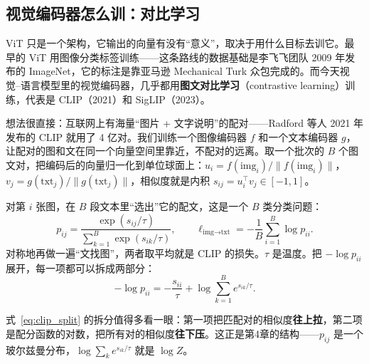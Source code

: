 \subsection{视觉编码器怎么训：对比学习}

ViT 只是一个架构，它输出的向量有没有“意义”，取决于用什么目标去训它。最早的 ViT 用图像分类标签训练——这条路线的数据基础是李飞飞团队 2009 年发布的 ImageNet，它的标注是靠亚马逊 Mechanical Turk 众包完成的。而今天视觉--语言模型里的视觉编码器，几乎都用\textbf{图文对比学习}（contrastive learning）训练，代表是 CLIP（2021）和 SigLIP（2023）。

想法很直接：互联网上有海量“图片 + 文字说明”的配对——Radford 等人 2021 年发布的 CLIP 就用了 4 亿对。我们训练一个图像编码器 $f$ 和一个文本编码器 $g$，让配对的图和文在同一个向量空间里靠近，不配对的远离。取一个批次的 $B$ 个图文对，把编码后的向量归一化到单位球面上：$u_i = f(\text{img}_i)/\|f(\text{img}_i)\|$，$v_j = g(\text{txt}_j)/\|g(\text{txt}_j)\|$，相似度就是内积 $s_{ij} = u_i^\top v_j \in [-1, 1]$。

\begin{keyformula}[title=CLIP 的对比损失]
对第 $i$ 张图，在 $B$ 段文本里“选出”它的配文，这是一个 $B$ 类分类问题：
\begin{equation}
    p_{ij} = \frac{\exp(s_{ij}/\tau)}{\sum_{k=1}^{B} \exp(s_{ik}/\tau)}, \qquad
    \ell_{\text{img}\to\text{txt}} = -\frac{1}{B}\sum_{i=1}^{B} \log p_{ii}.
    \label{eq:clip_loss}
\end{equation}
对称地再做一遍“文找图”，两者取平均就是 CLIP 的损失。$\tau$ 是温度。把 $-\log p_{ii}$ 展开，每一项都可以拆成两部分：
\begin{equation}
    -\log p_{ii} = -\frac{s_{ii}}{\tau} + \log \sum_{k=1}^{B} e^{s_{ik}/\tau}.
    \label{eq:clip_split}
\end{equation}
\end{keyformula}

式~\eqref{eq:clip_split} 的拆分值得多看一眼：第一项把匹配对的相似度\textbf{往上拉}，第二项是配分函数的对数，把所有对的相似度\textbf{往下压}。这正是第4章的结构——$p_{ij}$ 是一个玻尔兹曼分布，$\log\sum_k e^{s_{ik}/\tau}$ 就是 $\log Z$。

